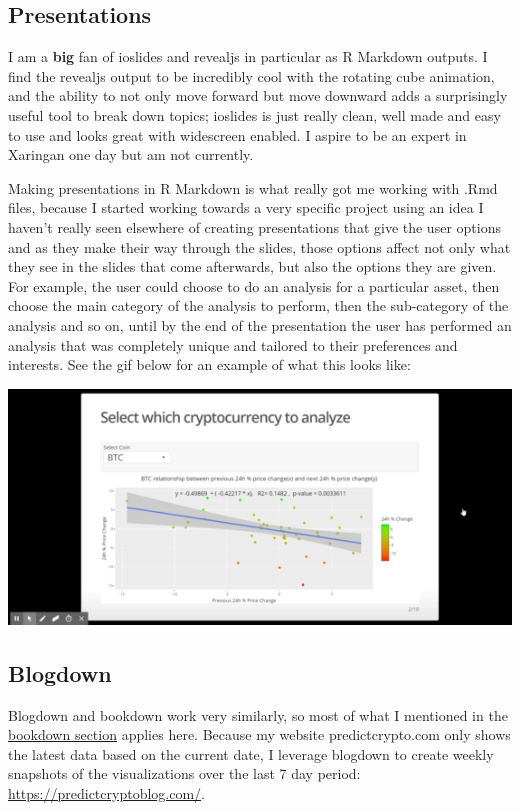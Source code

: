 \documentclass[
]{book}
\begin{document}
\hypertarget{presentations}{%
\subsection{Presentations}\label{presentations}}

I am a \textbf{big} fan of ioslides and revealjs in particular as R Markdown outputs. I find the revealjs output to be incredibly cool with the rotating cube animation, and the ability to not only move forward but move downward adds a surprisingly useful tool to break down topics; ioslides is just really clean, well made and easy to use and looks great with widescreen enabled. I aspire to be an expert in Xaringan one day but am not currently.

Making presentations in R Markdown is what really got me working with .Rmd files, because I started working towards a very specific project using an idea I haven't really seen elsewhere of creating presentations that give the user options and as they make their way through the slides, those options affect not only what they see in the slides that come afterwards, but also the options they are given. For example, the user could choose to do an analysis for a particular asset, then choose the main category of the analysis to perform, then the sub-category of the analysis and so on, until by the end of the presentation the user has performed an analysis that was completely unique and tailored to their preferences and interests. See the gif below for an example of what this looks like:

\includegraphics{images/dynamic_presentation.gif}

\hypertarget{blogdown}{%
\subsection{Blogdown}\label{blogdown}}

Blogdown\citep{R-blogdown} and bookdown work very similarly, so most of what I mentioned in the \protect\hyperlink{bookdown}{bookdown section} applies here. Because my website predictcrypto.com only shows the latest data based on the current date, I leverage blogdown to create weekly snapshots of the visualizations over the last 7 day period: \url{https://predictcryptoblog.com/}.
\end{document}

